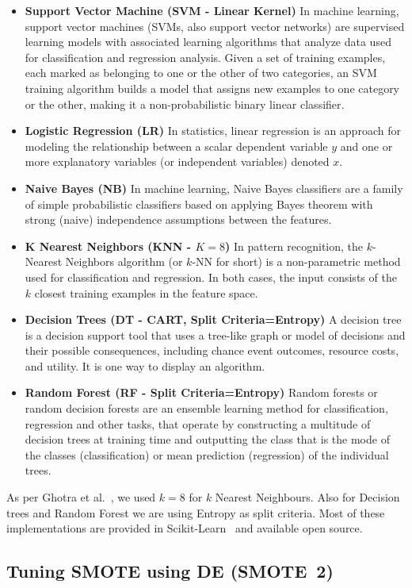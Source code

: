 \documentclass[sigconf,review, anonymous]{acmart}
\newcommand{\bi}{\begin{itemize}[leftmargin=0.4cm]}
\newcommand{\ei}{\end{itemize}}
\theoremstyle{break}
\theoremstyle{break}
\begin{document}
\bi
 \item \textbf{Support Vector Machine (SVM - Linear Kernel)}
 In machine learning, support vector machines (SVMs, also support vector networks) are supervised learning models with associated learning algorithms that analyze data used for classification and regression analysis. Given a set of training examples, each marked as belonging to one or the other of two categories, an SVM training algorithm builds a model that assigns new examples to one category or the other, making it a non-probabilistic binary linear classifier.
 \item \textbf{Logistic Regression (LR)}
 In statistics, linear regression is an approach for modeling the relationship between a scalar dependent variable $y$ and one or more explanatory variables (or independent variables) denoted $x$.
 \item \textbf{Naive Bayes (NB)}
 In machine learning, Naive Bayes classifiers are a family of simple probabilistic classifiers based on applying Bayes theorem with strong (naive) independence assumptions between the features.
 \item \textbf{K Nearest Neighbors (KNN - $K=8$)}
 In pattern recognition, the $k$-Nearest Neighbors algorithm (or $k$-NN for short) is a non-parametric method used for classification and regression. In both cases, the input consists of the $k$ closest training examples in the feature space.
 \item \textbf{Decision Trees (DT - CART, Split Criteria=Entropy)}
 A decision tree is a decision support tool that uses a tree-like graph or model of decisions and their possible consequences, including chance event outcomes, resource costs, and utility. It is one way to display an algorithm.
 \item \textbf{Random Forest (RF - Split Criteria=Entropy)}
 Random forests or random decision forests are an ensemble learning method for classification, regression and other tasks, that operate by constructing a multitude of decision trees at training time and outputting the class that is the mode of the classes (classification) or mean prediction (regression) of the individual trees. 
\ei

As per Ghotra et al.~\cite{ghotra2015revisiting}, we used $k=8$ for $k$ Nearest Neighbours. Also for Decision trees and Random Forest we are using Entropy as split criteria. Most of these implementations are provided in Scikit-Learn~\cite{pedregosa2011scikit} and available open source.

\subsection{\textbf{Tuning SMOTE using DE (SMOTE~2)}}
\label{sect:tuning}
\end{document}
